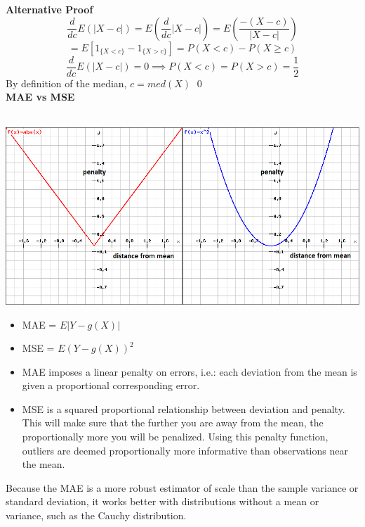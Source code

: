 \documentclass[DIV=14,titlepage=false]{scrreprt}
\begin{document}
\textbf{Alternative Proof}
\[\frac{d}{dc} E(|X-c|) = E\left(\frac{d}{dc} |X-c|\right) = E\left(\frac{-(X-c)}{|X-c|}\right)\]
\[= E\left[1_{\{X < c\}} - 1_{\{X > c\}}\right] = P(X < c) - P(X \geq c)\]
\[\frac{d}{dc} E(|X-c|) = 0 \implies P(X < c) = P(X > c) = \frac{1}{2} \]
By definition of the median, $c = med(X)$ \qed\\

\textbf{MAE vs MSE}\\\\
\begin{minipage}[c]{0.5\textwidth}
  \includegraphics[width=\textwidth]{./Images/msemae.png}
\end{minipage}
  \hfill
\begin{minipage}[c]{0.45\textwidth}
  \begin{itemize}
    \item MAE = $E|Y - g(X)|$
    \item MSE = $E(Y - g(X))^2$
  \end{itemize}
\end{minipage}
\begin{itemize}
  \item MAE imposes a linear penalty on errors, i.e.: each deviation from the mean is given a proportional corresponding error. 
  \item MSE is a squared proportional relationship between deviation and penalty. This will make sure that the further you are away from the mean, the proportionally more you will be penalized. Using this penalty function, outliers are deemed proportionally more informative than observations near the mean.
\end{itemize}
Because the MAE is a more robust estimator of scale than the sample variance or standard deviation, it works better with distributions without a mean or variance, such as the Cauchy distribution. \\
\end{document}
